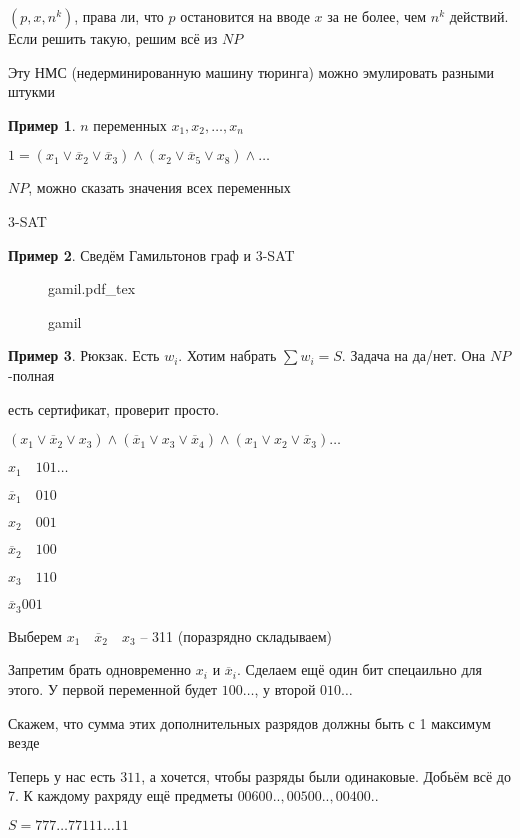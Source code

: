 \documentclass{book}
\theoremstyle{definition}
\newtheorem*{example}{Пример}
\newcommand{\incfig}[1]{%
    \def\svgwidth{\columnwidth}
    {#1.pdf_tex}
}
\begin{document}
$(p, x, n^k)$, права ли, что  $p$ остановится на вводе  $x$ за не более, чем  $n^k$ действий. Если решить такую, решим всё из  $NP$

Эту НМС (недерминированную машину тюринга) можно эмулировать разными штукми

 \begin{example}
    $n$ переменных  $x_1,x_2, \ldots, x_n$

    $1 = (x_1 \lor \overline x_2 \lor \overline x_3) \land \left( x_2 \lor \overline x_5 \lor x_8 \right) \land \ldots$ 
    
    $NP$, можно сказать значения всех переменных

     3-SAT
\end{example}

\begin{example}
    Сведём Гамильтонов граф и 3-SAT

\begin{figure}[!ht]
    \centering
    \incfig{gamil}
    \caption{gamil}
    \label{fig:gamil}
\end{figure}
\end{example}


\begin{example}
    Рюкзак. Есть $w_i$. Хотим набрать  $\sum w_i = S$. Задача на да/нет. Она  $NP$-полная

    есть сертификат, проверит просто.

    $(x_1 \lor \overline x_2 \lor x_3) \land \left( \overline x_1 \lor x_3\lor \overline x_4 \right) \land \left( x_1 \lor x_2 \lor \overline x_3 \right)  \ldots$

    $x_1\quad 1 0 1 \ldots$

    $\overline x_1\quad  0 1 0$
    
     $x_2\quad 0 0 1$

     $\overline x_2\quad 1 0 0$

     $x_3\quad 1 1 0$

     $\overline x_3 0 0 1$

     Выберем $x_1\quad \overline x_2\quad x_3$ -- 311 (поразрядно складываем)

     Запретим брать одновременно $x_i$ и  $\overline x_i$. Сделаем ещё один бит спецаильно для этого. У первой переменной будет  $1 0 0 \ldots$, у второй $0 1 0 \ldots$

     Скажем, что сумма этих дополнительных разрядов должны быть с 1 максимум везде

     Теперь у нас есть $311$,  а хочется, чтобы разряды были одинаковые. Добьём всё до 7. К каждому рахряду ещё предметы  $00600.., 00500.., 00400..$

     $S = 777\ldots 77111\ldots 11$

\end{example}
\end{document}
